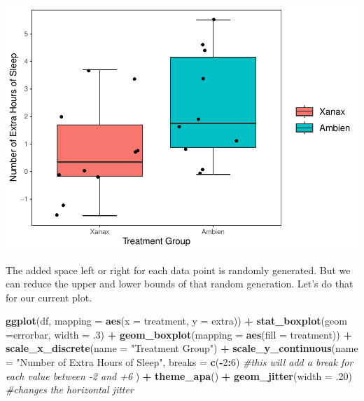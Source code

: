 \documentclass[
]{book}
\newenvironment{Shaded}{\begin{snugshade}}{\end{snugshade}}
\newcommand{\AttributeTok}[1]{\textcolor[rgb]{0.13,0.29,0.53}{#1}}
\newcommand{\CommentTok}[1]{\textcolor[rgb]{0.56,0.35,0.01}{\textit{#1}}}
\newcommand{\DecValTok}[1]{\textcolor[rgb]{0.00,0.00,0.81}{#1}}
\newcommand{\FunctionTok}[1]{\textcolor[rgb]{0.13,0.29,0.53}{\textbf{#1}}}
\newcommand{\NormalTok}[1]{#1}
\newcommand{\SpecialCharTok}[1]{\textcolor[rgb]{0.81,0.36,0.00}{\textbf{#1}}}
\newcommand{\StringTok}[1]{\textcolor[rgb]{0.31,0.60,0.02}{#1}}
\begin{document}
\includegraphics{rintro_demo_files/figure-latex/unnamed-chunk-301-1.pdf}

The added space left or right for each data point is randomly generated. But we can reduce the upper and lower bounds of that random generation. Let's do that for our current plot.

\begin{Shaded}
\begin{Highlighting}[]
\FunctionTok{ggplot}\NormalTok{(df, }\AttributeTok{mapping =} \FunctionTok{aes}\NormalTok{(}\AttributeTok{x =}\NormalTok{ treatment, }\AttributeTok{y =}\NormalTok{ extra)) }\SpecialCharTok{+} 
  \FunctionTok{stat\_boxplot}\NormalTok{(}\AttributeTok{geom =}\StringTok{\textquotesingle{}errorbar\textquotesingle{}}\NormalTok{, }\AttributeTok{width =}\NormalTok{ .}\DecValTok{3}\NormalTok{) }\SpecialCharTok{+}
  \FunctionTok{geom\_boxplot}\NormalTok{(}\AttributeTok{mapping =} \FunctionTok{aes}\NormalTok{(}\AttributeTok{fill =}\NormalTok{ treatment)) }\SpecialCharTok{+} 
  \FunctionTok{scale\_x\_discrete}\NormalTok{(}\AttributeTok{name =} \StringTok{"Treatment Group"}\NormalTok{) }\SpecialCharTok{+} 
  \FunctionTok{scale\_y\_continuous}\NormalTok{(}\AttributeTok{name =} \StringTok{"Number of Extra Hours of Sleep"}\NormalTok{, }
                     \AttributeTok{breaks =} \FunctionTok{c}\NormalTok{(}\SpecialCharTok{{-}}\DecValTok{2}\SpecialCharTok{:}\DecValTok{6}\NormalTok{) }\CommentTok{\#this will add a break for each value between {-}2 and +6}
\NormalTok{                     ) }\SpecialCharTok{+}
  \FunctionTok{theme\_apa}\NormalTok{() }\SpecialCharTok{+}
  \FunctionTok{geom\_jitter}\NormalTok{(}\AttributeTok{width =}\NormalTok{ .}\DecValTok{20}\NormalTok{) }\CommentTok{\#changes the horizontal jitter}
\end{Highlighting}
\end{Shaded}
\end{document}
